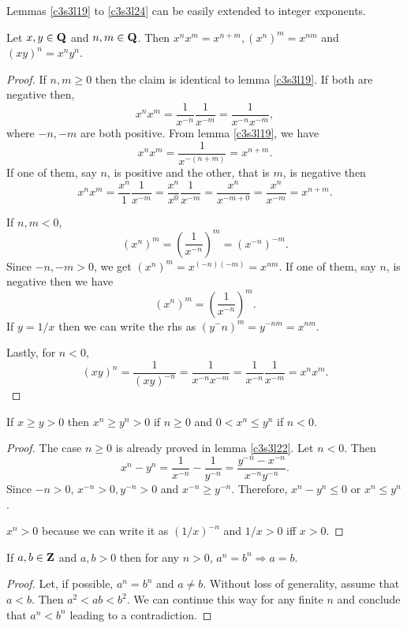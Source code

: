 Lemmas \ref{c3s3l19} to \ref{c3s3l24} can be easily extended to integer
exponents.
\begin{lem}\label{c3s3e25}
Let $x, y \in \mathbf{Q}$ and $n, m \in \mathbf{Q}$. Then $x^n x^m = x^{n + m}, 
(x^n)^m = x^{nm}$ and $(xy)^n = x^n y^n$.
\end{lem}
\begin{proof}
If $n, m \ge 0$ then the claim is identical to lemma \ref{c3s3l19}. If 
both are negative then,
\[
x^n x^m = \frac{1}{x^{-n}}\frac{1}{x^{-m}} = \frac{1}{x^{-n}x^{-m}},
\]
where $-n, -m$ are both positive. From lemma \ref{c3s3l19}, we have
\[
x^n x^m = \frac{1}{x^{-(n+m)}} = x^{n+m}.
\]
If one of them, say $n$, is positive and the other, that is $m$, is
negative then 
\[
x^n x^m = \frac{x^n}{1}\frac{1}{x^{-m}} = \frac{x^n}{x^0}\frac{1}{x^{-m}}
= \frac{x^n}{x^{-m + 0}} = \frac{x^n}{x^{-m}} = x^{n+m}.
\]

If $n, m < 0$,
\[
(x^n)^m = \left(\frac{1}{x^{-n}}\right)^m = (x^{-n})^{-m}.
\]
Since $-n, -m > 0$, we get $(x^n)^m = x^{(-n)(-m)} = x^{nm}$. If one of 
them, say $n$, is negative then we have
\[
(x^n)^m = \left(\frac{1}{x^{-n}}\right)^m.
\]
If $y = 1/x$ then we can write the rhs as $(y^-n)^m = y^{-nm} = x^{nm}$.

Lastly, for $n < 0$, 
\[
(xy)^n = \frac{1}{(xy)^{-n}} = \frac{1}{x^{-n}x^{-m}} = \frac{1}{x^{-n}}
\frac{1}{x^{-m}} = x^nx^m.
\]
\end{proof}

\begin{lem}\label{c3s3l26}
If $x \ge y > 0$ then $x^n \ge y^n > 0$ if $n \ge 0$ and $0 < x^n \le 
y^n$ if $n < 0$.
\end{lem}
\begin{proof}
The case $n \ge 0$ is already proved in lemma \ref{c3s3l22}. Let $n < 0$.
Then 
\[
x^n - y^n = \frac{1}{x^{-n}} - \frac{1}{y^{-n}} = 
\frac{y^{-n} - x^{-n}}{x^{-n}y^{-n}}.
\]
Since $-n > 0$, $x^{-n} > 0, y^{-n} > 0$ and $x^{-n} \ge y^{-n}$. 
Therefore, $x^n - y^n \le 0$ or $x^n \le y^n$.

$x^n > 0$ because we can write it as $(1/x)^{-n}$ and $1/x > 0$ iff $x > 
0$.
\end{proof}

\begin{lem}\label{c3s3l27}
If $a, b \in \mathbf{Z}$ and $a, b > 0$ then for any $n > 0$, $a^n = b^n 
\Rightarrow a = b$.
\end{lem}
\begin{proof}
Let, if possible, $a^n = b^n$ and $a \ne b$. Without loss of generality,
assume that $a < b$. Then $a^2 < ab < b^2$. We can continue this way for
any finite $n$ and conclude that $a^n < b^n$ leading to a contradiction.
\end{proof}

